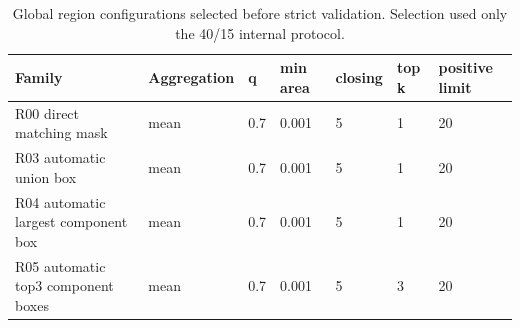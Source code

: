 \begin{table}[t]
\centering
\small
\caption{Global region configurations selected before strict validation. Selection used only the 40/15 internal protocol.}
\label{tab:selected_configs}
\begin{tabular}{lllllll}
\hline
Family & Aggregation & q & min area & closing & top k & positive limit \\
\hline
R00 direct matching mask & mean & 0.7 & 0.001 & 5 & 1 & 20 \\
R03 automatic union box & mean & 0.7 & 0.001 & 5 & 1 & 20 \\
R04 automatic largest component box & mean & 0.7 & 0.001 & 5 & 1 & 20 \\
R05 automatic top3 component boxes & mean & 0.7 & 0.001 & 5 & 3 & 20 \\
\hline
\end{tabular}
\end{table}
